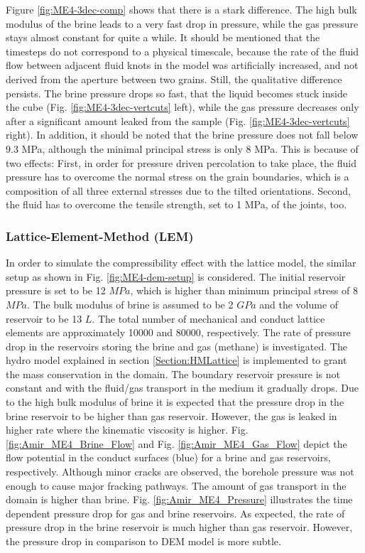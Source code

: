 Figure \ref{fig:ME4-3dec-comp} shows that there is a stark difference. The high bulk modulus of the brine leads to a very fast drop in pressure, while the gas pressure stays almost constant for quite a while. It should be mentioned that the timesteps do not correspond to a physical timescale, because the rate of the fluid flow between adjacent fluid knots in the model was artificially increased, and not derived from the aperture between two grains. Still, the qualitative difference persists. The brine pressure drops so fast, that the liquid becomes stuck inside the cube (Fig. \ref{fig:ME4-3dec-vertcuts} left), while the gas pressure decreases only after a significant amount leaked from the sample (Fig. \ref{fig:ME4-3dec-vertcuts} right). In addition, it should be noted that the brine pressure does not fall below 9.3 MPa, although the minimal principal stress is only 8 MPa. This is because of two effects: First, in order for pressure driven percolation to take place, the fluid pressure has to overcome the normal stress on the grain boundaries, which is a composition of all three external stresses due to the tilted orientations. Second, the fluid has to overcome the tensile strength, set to 1 MPa, of the joints, too. 

\subsubsection*{Lattice-Element-Method (LEM)}

In order to simulate the compressibility effect with the lattice model, the similar setup as shown in Fig. \ref{fig:ME4-dem-setup} is considered. The initial reservoir pressure is set to be 12 $MPa$, which is higher than minimum principal stress of 8 $MPa$. The bulk modulus of brine is assumed to be 2 $GPa$ and the volume of reservoir to be 13 $L$. The total number of mechanical and conduct lattice elements are approximately 10000 and 80000, respectively. The rate of pressure drop in the reservoirs storing the brine and gas (methane) is investigated. The hydro model explained in section \ref{Section:HMLattice} is implemented to grant the mass conservation in the domain. The boundary reservoir pressure is not constant and with the fluid/gas transport in the medium it gradually drops. Due to the high bulk modulus of brine it is expected that the pressure drop in the brine reservoir to be higher than gas reservoir. However, the gas is leaked in higher rate where the kinematic viscosity is higher. Fig. \ref{fig:Amir_ME4_Brine_Flow} and Fig. \ref{fig:Amir_ME4_Gas_Flow} depict the flow potential in the conduct surfaces (blue) for a brine and gas reservoirs, respectively. Although minor cracks are observed, the borehole pressure was not enough to cause major fracking pathways. The amount of gas transport in the domain is higher than brine. Fig. \ref{fig:Amir_ME4_Pressure} illustrates the time dependent pressure drop for gas and brine reservoirs. As expected, the rate of pressure drop in the brine reservoir is much higher than gas reservoir. However, the pressure drop in comparison to DEM model is more subtle. 


